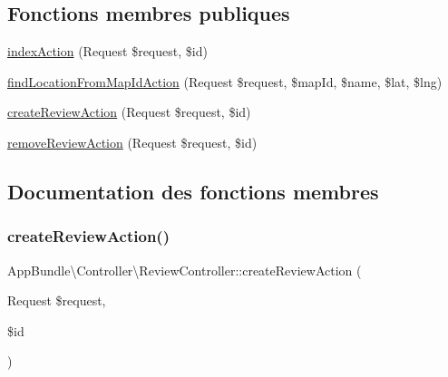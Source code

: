 \subsection*{Fonctions membres publiques}
\begin{DoxyCompactItemize}
\item 
\hyperlink{classAppBundle_1_1Controller_1_1ReviewController_aba2cab0f0fd4487f06d7d6ef205dd180}{index\+Action} (Request \$request, \$id)
\item 
\hyperlink{classAppBundle_1_1Controller_1_1ReviewController_a89fed73758d24e32060c68df209be415}{find\+Location\+From\+Map\+Id\+Action} (Request \$request, \$map\+Id, \$name, \$lat, \$lng)
\item 
\hyperlink{classAppBundle_1_1Controller_1_1ReviewController_ae9b55e90d1d07e4340a300253332f74c}{create\+Review\+Action} (Request \$request, \$id)
\item 
\hyperlink{classAppBundle_1_1Controller_1_1ReviewController_a71abcb3f902f7863f76b0ef4fea14dc3}{remove\+Review\+Action} (Request \$request, \$id)
\end{DoxyCompactItemize}


\subsection{Documentation des fonctions membres}
\mbox{\label{classAppBundle_1_1Controller_1_1ReviewController_ae9b55e90d1d07e4340a300253332f74c}} 
\subsubsection{\texorpdfstring{create\+Review\+Action()}{createReviewAction()}}
{\footnotesize\ttfamily App\+Bundle\textbackslash{}\+Controller\textbackslash{}\+Review\+Controller\+::create\+Review\+Action (\begin{DoxyParamCaption}\item[{Request}]{\$request,  }\item[{}]{\$id }\end{DoxyParamCaption})}


